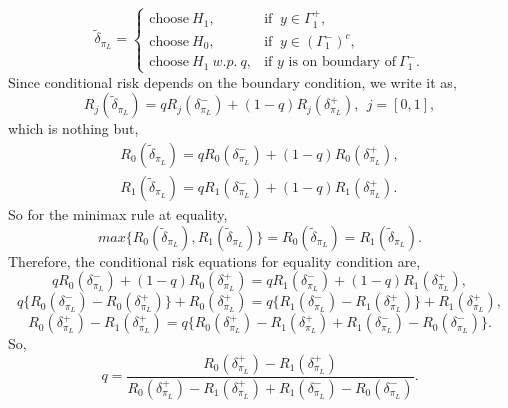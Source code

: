 \documentclass[a4paper,english,12pt]{article}
\begin{document}
\begin{equation}
{{\tilde \delta}_{\pi_L}}  = 
\begin{cases}
\mbox{choose}~ H_1, &\mbox{if }~y \in \Gamma_1^{+},\\
\mbox{choose}~ H_0, &\mbox{if }~y \in {(\Gamma_1^{-})}^c,\\
\mbox{choose}~ H_1 ~w.p.~ q, &\mbox{if }y\mbox{ is on boundary of}~\Gamma_1^{-}.
\end{cases}
\end{equation}
Since conditional risk depends on the boundary condition, we write it as,
\begin{equation}
R_j({{\tilde \delta}_{\pi_L}}) = qR_j(\delta_{\pi_L}^{-}) + (1-q)R_j(\delta_{\pi_L}^{+}),~~j=[0,1], 
\end{equation}
which is nothing but,
\begin{eqnarray}
R_0({{\tilde \delta}_{\pi_L}}) = qR_0(\delta_{\pi_L}^{-}) + (1-q)R_0(\delta_{\pi_L}^{+}), \nonumber \\
R_1({{\tilde \delta}_{\pi_L}}) = qR_1(\delta_{\pi_L}^{-}) + (1-q)R_1(\delta_{\pi_L}^{+}). 
\end{eqnarray}
So for the minimax rule at equality,
\begin{equation}
max\{ R_0({{\tilde \delta}_{\pi_L}}), R_1({{\tilde \delta}_{\pi_L}}) \} = R_0({{\tilde \delta}_{\pi_L}}) = R_1({{\tilde \delta}_{\pi_L}}).
\end{equation}
Therefore, the conditional risk equations for equality condition are,
\begin{equation*}
qR_0(\delta_{\pi_L}^{-}) + (1-q)R_0(\delta_{\pi_L}^{+}) = qR_1(\delta_{\pi_L}^{-}) + (1-q)R_1(\delta_{\pi_L}^{+}),
\end{equation*}
\begin{equation*}
q\{R_0(\delta_{\pi_L}^{-}) - R_0(\delta_{\pi_L}^{+})\} + R_0(\delta_{\pi_L}^{+}) = q\{R_1(\delta_{\pi_L}^{-}) - R_1(\delta_{\pi_L}^{+})\} + R_1(\delta_{\pi_L}^{+}),
\end{equation*}
\begin{equation}
R_0(\delta_{\pi_L}^{+}) - R_1(\delta_{\pi_L}^{+}) = q\{R_0(\delta_{\pi_L}^{+}) - R_1(\delta_{\pi_L}^{+}) + R_1(\delta_{\pi_L}^{-}) - R_0(\delta_{\pi_L}^{-})\}.
\end{equation}
So,
\begin{equation}
\label{qeq}
q = \frac{R_0(\delta_{\pi_L}^{+}) - R_1(\delta_{\pi_L}^{+})}{R_0(\delta_{\pi_L}^{+}) - R_1(\delta_{\pi_L}^{+}) + R_1(\delta_{\pi_L}^{-}) - R_0(\delta_{\pi_L}^{-})}.
\end{equation}
\end{document}
